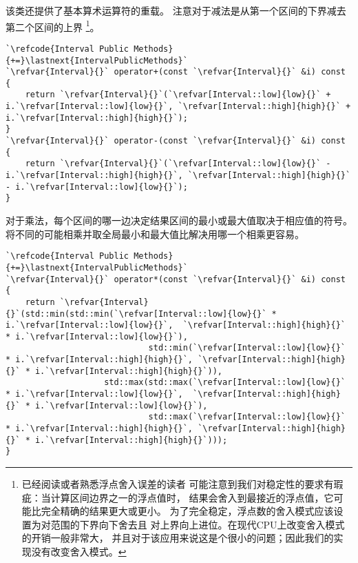 该类还提供了基本算术运算符的重载。
注意对于减法是从第一个区间的下界减去第二个区间的上界
\footnote{已经阅读\protect{}或者熟悉浮点舍入误差的读者
    可能注意到我们对稳定性的要求有瑕疵：当计算区间边界之一的浮点值时，
    结果会舍入到最接近的浮点值，它可能比完全精确的结果更大或更小。
    为了完全稳定，浮点数的舍入模式应该设置为对范围的下界向下舍去且
    对上界向上进位。在现代CPU上改变舍入模式的开销一般非常大，
    并且对于该应用来说这是个很小的问题；因此我们的实现没有改变舍入模式。}。
\begin{lstlisting}
`\refcode{Interval Public Methods}{+=}\lastnext{IntervalPublicMethods}`
`\refvar{Interval}{}` operator+(const `\refvar{Interval}{}` &i) const {
    return `\refvar{Interval}{}`(`\refvar[Interval::low]{low}{}` + i.`\refvar[Interval::low]{low}{}`, `\refvar[Interval::high]{high}{}` + i.`\refvar[Interval::high]{high}{}`);
}
`\refvar{Interval}{}` operator-(const `\refvar{Interval}{}` &i) const {
    return `\refvar{Interval}{}`(`\refvar[Interval::low]{low}{}` - i.`\refvar[Interval::high]{high}{}`, `\refvar[Interval::high]{high}{}` - i.`\refvar[Interval::low]{low}{}`);
}
\end{lstlisting}

对于乘法，每个区间的哪一边决定结果区间的最小或最大值取决于相应值的符号。
将不同的可能相乘并取全局最小和最大值比解决用哪一个相乘更容易。
\begin{lstlisting}
`\refcode{Interval Public Methods}{+=}\lastnext{IntervalPublicMethods}`
`\refvar{Interval}{}` operator*(const `\refvar{Interval}{}` &i) const {
    return `\refvar{Interval}{}`(std::min(std::min(`\refvar[Interval::low]{low}{}` * i.`\refvar[Interval::low]{low}{}`,  `\refvar[Interval::high]{high}{}` * i.`\refvar[Interval::low]{low}{}`),
                             std::min(`\refvar[Interval::low]{low}{}` * i.`\refvar[Interval::high]{high}{}`, `\refvar[Interval::high]{high}{}` * i.`\refvar[Interval::high]{high}{}`)),
                    std::max(std::max(`\refvar[Interval::low]{low}{}` * i.`\refvar[Interval::low]{low}{}`,  `\refvar[Interval::high]{high}{}` * i.`\refvar[Interval::low]{low}{}`),
                             std::max(`\refvar[Interval::low]{low}{}` * i.`\refvar[Interval::high]{high}{}`, `\refvar[Interval::high]{high}{}` * i.`\refvar[Interval::high]{high}{}`)));
}
\end{lstlisting}

